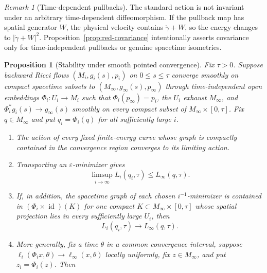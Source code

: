 \documentclass[10pt]{coll-l}
\newtheorem{proposition}[theorem]{Proposition}
\theoremstyle{definition}
\theoremstyle{remark}
\newtheorem{remark}[theorem]{Remark}
\numberwithin{section}{chapter}
\numberwithin{equation}{chapter}
\begin{document}
\begin{remark}[Time-dependent pullbacks]
\label{rem:red-time-dependent-pullback}
The standard action is not invariant under an arbitrary time-dependent
diffeomorphism.  If the pullback map has spatial generator $W$, the physical
velocity contains $\dot\gamma+W$, so the energy changes to
$|\dot\gamma+W|^2$.  Proposition~\ref{prop:red-covariance} intentionally
asserts covariance only for time-independent pullbacks or genuine spacetime
isometries.
\end{remark}

\begin{proposition}[Stability under smooth pointed convergence]
\label{prop:red-action-convergence}
Fix $\tau>0$.  Suppose backward Ricci flows
$(M_i,g_i(s),p_i)$ on $0\leq s\leq\tau$ converge smoothly on compact
spacetime subsets to $(M_\infty,g_\infty(s),p_\infty)$ through
time-independent open embeddings $\Phi_i:U_i\to M_i$ such that
$\Phi_i(p_\infty)=p_i$, the $U_i$ exhaust $M_\infty$, and
$\Phi_i^*g_i(s)\to g_\infty(s)$ smoothly on every compact subset of
$M_\infty\times[0,\tau]$.  Fix $q\in M_\infty$ and put
$q_i=\Phi_i(q)$ for all sufficiently large $i$.
\begin{enumerate}
\item The action of every fixed finite-energy curve whose graph is compactly
      contained in the convergence region converges to its limiting action.
\item Transporting an $\varepsilon$-minimizer gives
\begin{equation}
 \limsup_{i\to\infty}L_i(q_i,\tau)
       \leq L_\infty(q,\tau).                           \label{eq:red-action-limsup}
\end{equation}
\item If, in addition, the spacetime graph of each chosen
      $i^{-1}$-minimizer is contained in
      $(\Phi_i\times\operatorname{id})(K)$ for one
      compact $K\subset M_\infty\times[0,\tau]$ whose spatial projection
      lies in every sufficiently large $U_i$, then
\begin{equation}
                 L_i(q_i,\tau)\longrightarrow
                 L_\infty(q,\tau).                      \label{eq:red-action-full-convergence}
\end{equation}
\item More generally, fix a time $\theta$ in a common convergence interval,
      suppose $\ell_i(\Phi_i x,\theta)\to\ell_\infty(x,\theta)$ locally
      uniformly, fix $z\in M_\infty$, and put $z_i=\Phi_i(z)$.  Then
\begin{equation}

\end{equation}
\end{enumerate}
\end{proposition}
\end{document}
